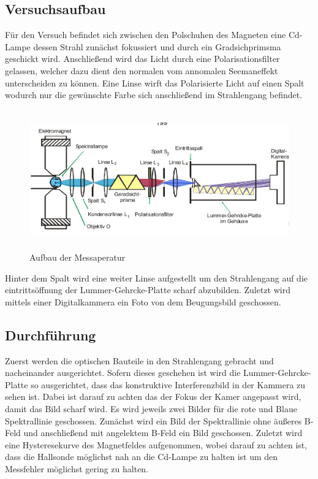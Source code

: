 \subsection{Versuchsaufbau}
Für den Versuch befindet sich zwischen den Polschuhen des Magneten eine Cd-Lampe dessen Strahl zunächst fokussiert und durch ein Gradsichprimsma geschickt wird. Anschließend wird das Licht durch eine Polarisationsfilter gelassen, welcher dazu dient den normalen vom annomalen Seemaneffekt unterscheiden zu können. Eine Linse wirft das Polarisierte Licht auf einen Spalt wodurch nur die gewünschte Farbe sich anschließend im Strahlengang befindet. 
\begin{figure}[H]
  \centering
  \includegraphics[height=6cm]{Bilder/Aufbau.png}
  \caption{Aufbau der Messaperatur \cite{V27}}
  \label{fig:<+label+>}
\end{figure}
Hinter dem Spalt wird eine weiter Linse aufgestellt um den Strahlengang auf die eintrittsöffnung der Lummer-Gehrcke-Platte scharf abzubilden. Zuletzt wird mittels einer Digitalkammera ein Foto von dem Beugungsbild geschossen.

\subsection{Durchführung}
Zuerst werden die optischen Bauteile in den Strahlengang gebracht und nacheinander ausgerichtet. Sofern dieses geschehen ist wird die Lummer-Gehrcke-Platte so ausgerichtet, dass das konstruktive Interferenzbild in der Kammera zu sehen ist. Dabei ist darauf zu achten das der Fokus der Kamer angepasst wird, damit das Bild scharf wird. Es wird jeweils zwei Bilder für die rote und Blaue Spektrallinie geschossen. Zunächst wird ein Bild der Spektrallinie ohne äußeres B-Feld und anschließend mit angelektem B-Feld ein Bild geschossen. Zuletzt wird eine Hysteresekurve des Magnetfeldes aufgenommen, wobei darauf zu achten ist, dass die Hallsonde möglichst nah an die Cd-Lampe zu halten ist um den Messfehler möglichst gering zu halten.
